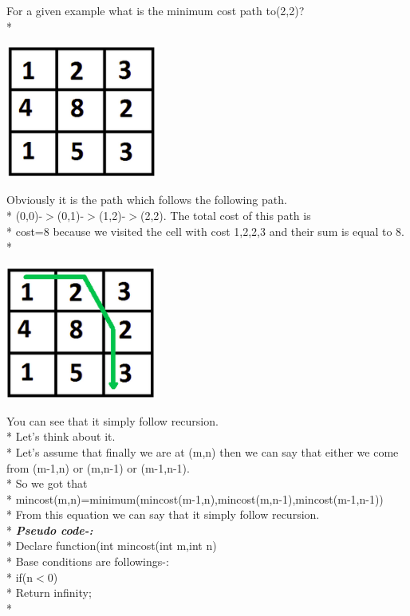 \documentclass[12pt]{book}
\begin{document}
For a given example what is the minimum cost path to(2,2)? \\*
\begin{center}
    \includegraphics[width =5cm]{90JsYvl.png}    
\end{center}
Obviously it is the path which follows the following path. \\*
(0,0)-$>$(0,1)-$>$(1,2)-$>$(2,2). The total cost of this path is  \\*
cost=8 because we visited the cell with cost 1,2,2,3 and their sum is equal to 8. \\*
\begin{center}
    \includegraphics[width =5cm]{UYv9kel.png}    
\end{center}
You can see that it simply follow recursion. \\*
Let’s think about it. \\*
Let’s assume that finally we are at (m,n) then we can say that either we come from (m-1,n) or (m,n-1) or (m-1,n-1). \\*
So we got that \\*
mincost(m,n)=minimum(mincost(m-1,n),mincost(m,n-1),mincost(m-1,n-1)) \\*
From this equation we can say that it simply follow recursion. \\*
\textbf{\textit{Pseudo code-:}} \\*
Declare function(int mincost(int m,int n) \\*
Base conditions are followings-:\\*
if(n$<$0) \\*
\phantom{x} \hspace{3ex}Return infinity;\\*
\end{document}
